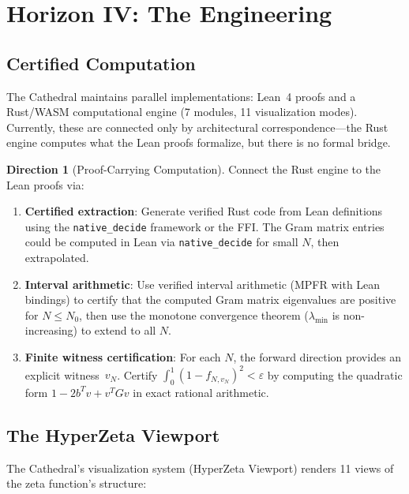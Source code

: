 \documentclass[11pt,a4paper]{article}
\theoremstyle{definition}
\newtheorem{direction}[definition]{Direction}
\newcommand{\lean}[1]{\texttt{#1}}
\begin{document}
\section{Horizon IV: The Engineering}
\label{sec:engineering}

\subsection{Certified Computation}

The Cathedral maintains parallel implementations: Lean~4 proofs and a
Rust/WASM computational engine (7 modules, 11 visualization modes).
Currently, these are connected only by architectural correspondence---the
Rust engine computes what the Lean proofs formalize, but there is no
formal bridge.

\begin{direction}[Proof-Carrying Computation]
Connect the Rust engine to the Lean proofs via:
\begin{enumerate}
  \item \textbf{Certified extraction}: Generate verified Rust code from
    Lean definitions using the \lean{native\_decide} framework or the
    FFI. The Gram matrix entries could be computed in Lean via
    \lean{native\_decide} for small $N$, then extrapolated.
  \item \textbf{Interval arithmetic}: Use verified interval arithmetic
    (MPFR with Lean bindings) to certify that the computed Gram matrix
    eigenvalues are positive for $N \le N_0$, then use the monotone
    convergence theorem ($\lambda_{\min}$ is non-increasing) to extend
    to all $N$.
  \item \textbf{Finite witness certification}: For each $N$, the
    forward direction provides an explicit witness~$v_N$. Certify
    $\int_0^1 (1 - f_{N,v_N})^2 < \varepsilon$ by computing the
    quadratic form $1 - 2b^T v + v^T G v$ in exact rational arithmetic.
\end{enumerate}
\end{direction}

\subsection{The HyperZeta Viewport}

The Cathedral's visualization system (HyperZeta Viewport) renders 11
views of the zeta function's structure:
\end{document}
